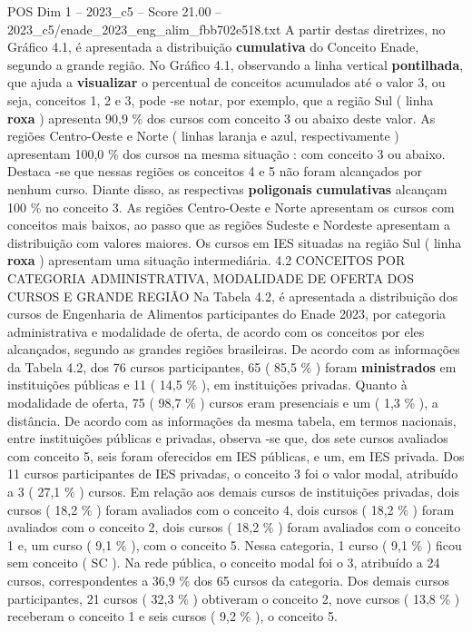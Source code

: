 \begin{textsample}{POS Dim 1 – 2023\_c5 – Score 21.00 – 2023\_c5/enade\_2023\_eng\_alim\_fbb702e518.txt}
A partir destas diretrizes, no Gráfico 4.1, é apresentada a distribuição \textbf{cumulativa} do Conceito Enade, segundo a grande região.
No Gráfico 4.1, observando a linha vertical \textbf{pontilhada}, que ajuda a \textbf{visualizar} o percentual de conceitos acumulados até o valor 3, ou seja, conceitos 1, 2 e 3, pode -se notar, por exemplo, que a região Sul ( linha \textbf{roxa} ) apresenta 90,9 \% dos cursos com conceito 3 ou abaixo deste valor.
As regiões Centro-Oeste e Norte ( linhas laranja e azul, respectivamente ) apresentam 100,0 \% dos cursos na mesma situação : com conceito 3 ou abaixo.
Destaca -se que nessas regiões os conceitos 4 e 5 não foram alcançados por nenhum curso.
Diante disso, as respectivas \textbf{poligonais} \textbf{cumulativas} alcançam 100 \% no conceito 3.
As regiões Centro-Oeste e Norte apresentam os cursos com conceitos mais baixos, ao passo que as regiões Sudeste e Nordeste apresentam a distribuição com valores maiores.
Os cursos em IES situadas na região Sul ( linha \textbf{roxa} ) apresentam uma situação intermediária. 4.2 CONCEITOS POR CATEGORIA ADMINISTRATIVA, MODALIDADE DE OFERTA DOS CURSOS E GRANDE REGIÃO Na Tabela 4.2, é apresentada a distribuição dos cursos de Engenharia de Alimentos participantes do Enade 2023, por categoria administrativa e modalidade de oferta, de acordo com os conceitos por eles alcançados, segundo as grandes regiões brasileiras.
De acordo com as informações da Tabela 4.2, dos 76 cursos participantes, 65 ( 85,5 \% ) foram \textbf{ministrados} em instituições públicas e 11 ( 14,5 \% ), em instituições privadas.
Quanto à modalidade de oferta, 75 ( 98,7 \% ) cursos eram presenciais e um ( 1,3 \% ), a distância.
De acordo com as informações da mesma tabela, em termos nacionais, entre instituições públicas e privadas, observa -se que, dos sete cursos avaliados com conceito 5, seis foram oferecidos em IES públicas, e um, em IES privada.
Dos 11 cursos participantes de IES privadas, o conceito 3 foi o valor modal, atribuído a 3 ( 27,1 \% ) cursos.
Em relação aos demais cursos de instituições privadas, dois cursos ( 18,2 \% ) foram avaliados com o conceito 4, dois cursos ( 18,2 \% ) foram avaliados com o conceito 2, dois cursos ( 18,2 \% ) foram avaliados com o conceito 1 e, um curso ( 9,1 \% ), com o conceito 5.
Nessa categoria, 1 curso ( 9,1 \% ) ficou sem conceito ( SC ).
Na rede pública, o conceito modal foi o 3, atribuído a 24 cursos, correspondentes a 36,9 \% dos 65 cursos da categoria.
Dos demais cursos participantes, 21 cursos ( 32,3 \% ) obtiveram o conceito 2, nove cursos ( 13,8 \% ) receberam o conceito 1 e seis cursos ( 9,2 \% ), o conceito 5.

\end{textsample}
